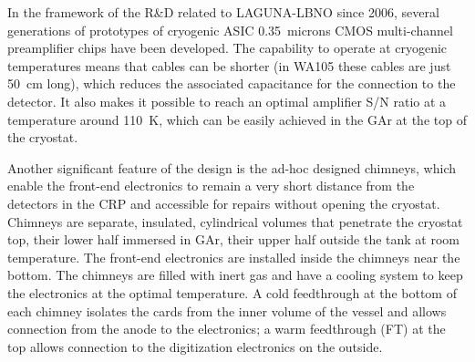 In the framework of the R\&D related to LAGUNA-LBNO since 2006,
several generations of prototypes of cryogenic ASIC 0.35~microns CMOS
multi-channel preamplifier chips have been developed. 
The capability to operate at cryogenic temperatures means that cables can be shorter 
(in WA105 these cables are just 50~cm long), which reduces the associated 
capacitance for the connection to the detector. It also makes it possible to reach
 an optimal amplifier S/N ratio at a
temperature around 110~K, which can be easily achieved in the GAr at
the top of the cryostat. 

Another significant feature of the design is the ad-hoc designed chimneys, which 
enable the front-end electronics to remain a very short
distance from the detectors in the CRP and accessible for repairs without
opening the cryostat.
Chimneys are
separate, insulated, cylindrical volumes that penetrate the cryostat top, 
their lower half immersed in GAr, their upper half outside the tank at room temperature.
The front-end electronics are installed inside the chimneys near the bottom. 
The chimneys are filled with inert gas and have a cooling
system to keep the electronics at the optimal temperature.  A cold feedthrough at
the bottom of each chimney isolates the cards from the inner volume of the
vessel and allows connection from the anode to the electronics;
a warm feedthrough (FT) at the top allows connection to the digitization electronics 
on the outside.


